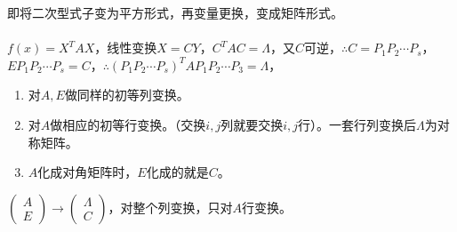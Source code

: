 即将二次型式子变为平方形式，再变量更换，变成矩阵形式。

\paragraph{}

$f(x)=X^TAX$，线性变换$X=CY$，$C^TAC=\Lambda$，又$C$可逆，$\therefore C=P_1P_2\cdots P_s$，$EP_1P_2\cdots P_s=C$，$\therefore(P_1P_2\cdots P_s)^TAP_1P_2\cdots P_3=\Lambda$，

\begin{enumerate}
    \item 对$A,E$做同样的初等列变换。
    \item 对$A$做相应的初等行变换。（交换$i,j$列就要交换$i,j$行）。一套行列变换后$\Lambda$为对称矩阵。
    \item $A$化成对角矩阵时，$E$化成的就是$C$。
\end{enumerate}

$\left(\begin{array}{c}
    A \\
    E
\end{array}\right)\rightarrow\left(\begin{array}{c}
    \Lambda \\
    C
\end{array}\right)$，对整个列变换，只对$A$行变换。

